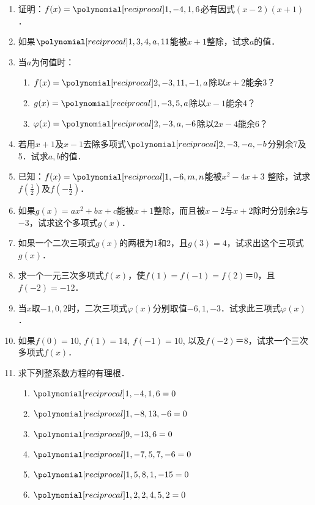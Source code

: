 \begin{enumerate}
\item 证明：$f(x)=\poly{1,-4,1,6}$必有因式$(x-2)(x+1)$．
\item 如果$\poly{1,3,4,a,11}$能被$x+1$整除，试求$a$的值．
\item 当$a$为何值时：
\begin{enumerate}
    \item $f(x)=\poly{2,-3,11,-1,a}$除以$x+2$能余3？
    \item $g(x)=\poly{1,-3,5,a}$除以$x-1$能余4？
    \item $\varphi(x)=\poly{2,-3,a,-6}$除以$2x-4$能余6？
\end{enumerate}

\item 若用$x+1$及$x-1$去除多项式$\poly{2,-3,-a,-b}$分别余7及5．试求$a,b$的值．

\item 已知：$f(x)=\poly{1,-6,m,n}$能被$x^2-4x+3$
整除，试求$f\left(\frac{1}{2}\right)$及$f\left(-\frac{1}{2}\right)$．

\item 如果$g(x)=ax^2+bx+c$能被$x+1$整除，而且被$x-2$与$x+2$除时分别余2与$-3$，试求这个多项式$g(x)$．

\item 如果一个二次三项式$g(x)$的两根为1和2，且$g(3)=4$，试求出这个三项式$g(x)$．

\item 求一个一元三次多项式$f(x)$，使$f(1)=f(-1)=f(2)＝0$，且$f(-2)=-12$．
\item 当$x$取$-1, 0, 2$时，二次三项式$\varphi(x)$分别取值$-6,1,-3$．试求此三项式$\varphi(x)$．
\item 如果$f(0)=10$, $f(1)=14$, $f(-1)=10$, 以及$f(-2)＝8$，试求一个三次多项式$f(x)$．

\item 求下列整系数方程的有理根．
\begin{multicols}{2}
    \begin{enumerate}
    \item $\poly{1,-4,1,6}=0$
    \item $\poly{1,-8,13,-6}=0$
    \item $\poly{9,-13,6}=0$
    \item $\poly{1,-7,5,7,-6}=0$
    \item $\poly{1,5,8,1,-15}=0$
    \item $\poly{1,2,2,4,5,2}=0$
\end{enumerate}
\end{multicols}


\end{enumerate}
